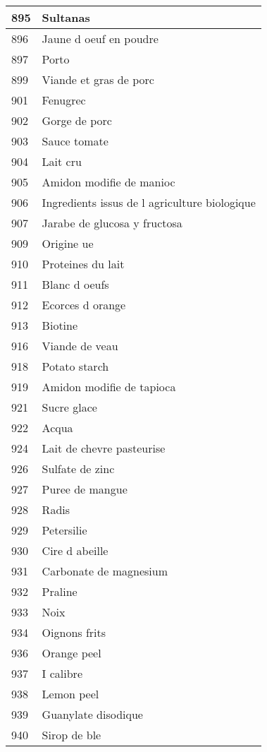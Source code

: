 \begin{longtable}{|l|l|}
895 & Sultanas \\ \hline 
896 & Jaune d oeuf en poudre \\ \hline 
897 & Porto \\ \hline 
899 & Viande et gras de porc \\ \hline 
901 & Fenugrec \\ \hline 
902 & Gorge de porc \\ \hline 
903 & Sauce tomate \\ \hline 
904 & Lait cru \\ \hline 
905 & Amidon modifie de manioc \\ \hline 
906 & Ingredients issus de l agriculture biologique \\ \hline 
907 & Jarabe de glucosa y fructosa \\ \hline 
909 & Origine ue \\ \hline 
910 & Proteines du lait \\ \hline 
911 & Blanc d oeufs \\ \hline 
912 & Ecorces d orange \\ \hline 
913 & Biotine \\ \hline 
916 & Viande de veau \\ \hline 
918 & Potato starch \\ \hline 
919 & Amidon modifie de tapioca \\ \hline 
921 & Sucre glace \\ \hline 
922 & Acqua \\ \hline 
924 & Lait de chevre pasteurise \\ \hline 
926 & Sulfate de zinc \\ \hline 
927 & Puree de mangue \\ \hline 
928 & Radis \\ \hline 
929 & Petersilie \\ \hline 
930 & Cire d abeille \\ \hline 
931 & Carbonate de magnesium \\ \hline 
932 & Praline \\ \hline 
933 & Noix \\ \hline 
934 & Oignons frits \\ \hline 
936 & Orange peel \\ \hline 
937 & I calibre \\ \hline 
938 & Lemon peel \\ \hline 
939 & Guanylate disodique \\ \hline 
940 & Sirop de ble \\ \hline 

\end{longtable}

